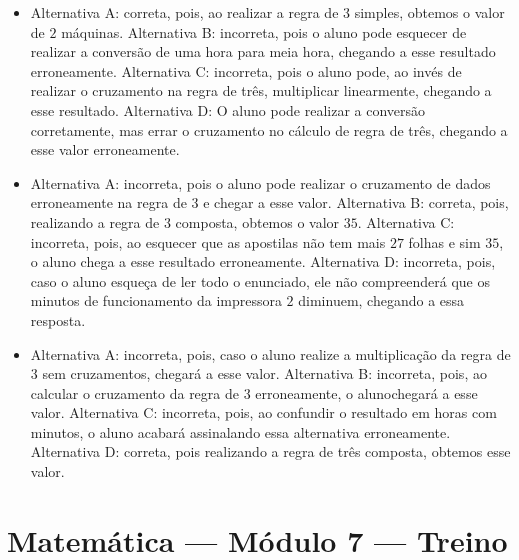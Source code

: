\begin{itemize}
\item Alternativa A: correta, pois, ao realizar a regra de $3$ simples, obtemos
o valor de $2$ máquinas.
Alternativa B: incorreta, pois o aluno pode esquecer de realizar a
conversão de uma hora para meia hora, chegando a esse resultado
erroneamente.
Alternativa C: incorreta, pois o aluno pode, ao invés de realizar o
cruzamento na regra de três, multiplicar linearmente, chegando a esse
resultado.
Alternativa D: O aluno pode realizar a conversão corretamente, mas errar
o cruzamento no cálculo de regra de três, chegando a esse valor
erroneamente.

\item Alternativa A: incorreta, pois o aluno pode realizar o cruzamento de
dados erroneamente na regra de $3$ e chegar a esse valor.
Alternativa B: correta, pois, realizando a regra de $3$ composta, obtemos
o valor $35$.
Alternativa C: incorreta, pois, ao esquecer que as apostilas não tem
mais $27$ folhas e sim $35$, o aluno chega a esse resultado erroneamente.
Alternativa D: incorreta, pois, caso o aluno esqueça de ler todo o
enunciado, ele não compreenderá que os minutos de funcionamento da
impressora $2$ diminuem, chegando a essa resposta.

\item Alternativa A: incorreta, pois, caso o aluno realize a multiplicação da
regra de $3$ sem cruzamentos, chegará a esse valor.
Alternativa B: incorreta, pois, ao calcular o cruzamento da regra de $3$
erroneamente, o alunochegará a esse valor.
Alternativa C: incorreta, pois, ao confundir o resultado em horas com
minutos, o aluno acabará assinalando essa alternativa erroneamente.
Alternativa D: correta, pois realizando a regra de três composta,
obtemos esse valor.
\end{itemize}

\section*{Matemática — Módulo 7 — Treino}

